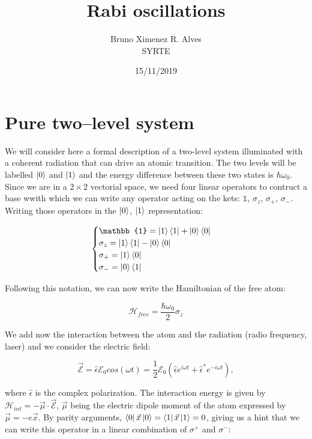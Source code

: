 \documentclass[letterpaper, 12pt]{article}
\title{Rabi oscillations}
\author{
Bruno Ximenez R. Alves \\
SYRTE\\
}
\date{15/11/2019}
\begin{document}
\maketitle
\tableofcontents
\section{Pure two--level system}

We will consider here a formal description of a two-level system illuminated with a coherent radiation that can drive an atomic transition.
The two levels will be labelled $\ket{0}$ and $\ket{1}$ and the energy difference between these two states is $\hbar \omega _{0}$. 
Since we are in a $2 \times 2$ vectorial space, we need four linear operators to contruct a base wwith which we can write any operator acting 
on the kets: {$\mathbb{1}$, $\sigma_{z}$, $\sigma_{+}$, $\sigma_{-}$}. Writing those operators in the $\ket{0}$, $\ket{1}$ representation:

\begin{equation}
\begin{cases}
    \mathbb{1} =  \ket{1}\bra{1} + \ket{0}\bra{0}\\
    \sigma_{z} = \ket{1}\bra{1} - \ket{0}\bra{0} \\
    \sigma_{+} = \ket{1}\bra{0} \\
    \sigma_{-} = \ket{0}\bra{1}
\end{cases}
\end{equation}

Following this notation, we can now write the Hamiltonian of the free atom:

\begin{equation}
    \mathcal{H} _{free} = \frac {\hbar \omega_{0}}{2} \sigma_{z}
\end{equation}

We add now the interaction between the atom and the radiation (radio frequency, laser) and we consider the electric field:

\begin{equation}
    \vec {\mathcal{E}} = \hat{\epsilon} \mathcal{E}_{0} cos (\omega t) = \frac{1}{2} \mathcal{E}_{0} ( \hat{\epsilon}e^{i \omega t} + \hat{\epsilon}^{*}e^{ - i \omega t}),
\end{equation}

where $\hat{\epsilon}$ is the complex polarization. The interaction energy is given by $\mathcal{H}_{int} = - \vec{\mu} \cdot \vec{\mathcal{E}}$, $\vec{\mu}$ being the electric dipole moment of the atom 
expressed by $\vec{\mu} =  - e \vec{x}$. By parity arguments, $\bra{0}\vec{x}\ket{0} = \bra{1}\vec{x}\ket{1} = 0$, giving us a hint that we can write this operator in a linear combination of $\sigma^{+}$ and $\sigma^{-}$: 
\end{document}
